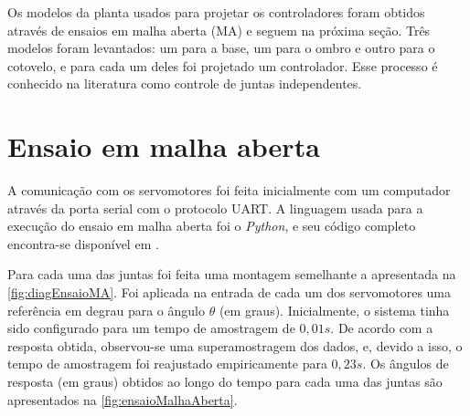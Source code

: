Os modelos da planta usados para projetar os controladores foram obtidos através de ensaios em malha aberta (MA) e seguem 
na próxima seção. Três modelos foram levantados: um para a base, um para o ombro e outro para o cotovelo, e para 
cada um deles foi projetado um controlador. Esse processo é conhecido na literatura como controle de juntas independentes.

\section{Ensaio em malha aberta}

A comunicação com os servomotores foi feita inicialmente com um computador através da porta serial com o protocolo 
UART. A linguagem usada para a execução do ensaio em malha aberta foi o \textit{Python}, e seu código completo
encontra-se disponível em \cite{lelis_model}.

Para cada uma das juntas foi feita uma montagem semelhante a apresentada na \autoref{fig:diagEnsaioMA}. Foi aplicada na entrada de
cada um dos servomotores uma referência em degrau para o ângulo $\theta$ (em graus). Inicialmente, o sistema tinha sido
configurado para um tempo de amostragem de $0,01s$. De acordo com a resposta obtida, observou-se uma superamostragem dos dados,
e, devido a isso, o tempo de amostragem foi reajustado empiricamente para $0,23s$. Os ângulos de resposta (em graus) obtidos
ao longo do tempo para cada uma das juntas são apresentados na \autoref{fig:ensaioMalhaAberta}.

